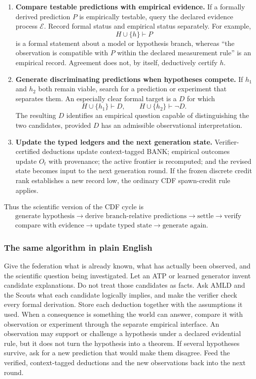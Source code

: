 \documentclass[11pt]{article}
\theoremstyle{definition}
\begin{document}
\begin{enumerate}[label=\textbf{Step \arabic*.},leftmargin=*]
\item \textbf{Compare testable predictions with empirical evidence.}
If a formally derived prediction $P$ is empirically testable, query the declared evidence process $\mathcal E$. Record formal status and empirical status separately. For example,
\[
H\cup\{h\}\vdash P
\]
is a formal statement about a model or hypothesis branch, whereas ``the observation is compatible with $P$ within the declared measurement rule'' is an empirical record. Agreement does not, by itself, deductively certify $h$.

\item \textbf{Generate discriminating predictions when hypotheses compete.}
If $h_1$ and $h_2$ both remain viable, search for a prediction or experiment that separates them. An especially clear formal target is a $D$ for which
\[
H\cup\{h_1\}\vdash D,
\qquad
H\cup\{h_2\}\vdash\neg D.
\]
The resulting $D$ identifies an empirical question capable of distinguishing the two candidates, provided $D$ has an admissible observational interpretation.

\item \textbf{Update the typed ledgers and the next generation state.}
Verifier-certified deductions update context-tagged BANK; empirical outcomes update $O_t$ with provenance; the active frontier is recomputed; and the revised state becomes input to the next generation round. If the frozen discrete credit rank establishes a new record low, the ordinary CDF spawn-credit rule applies.
\end{enumerate}

Thus the scientific version of the CDF cycle is
\[
\boxed{\begin{gathered}
\text{generate hypothesis}\to\text{derive branch-relative predictions}\to\text{settle}\to\text{verify}\\
\text{compare with evidence}\to\text{update typed state}\to\text{generate again}.
\end{gathered}}
\]

\subsubsection*{The same algorithm in plain English}
Give the federation what is already known, what has actually been observed, and the scientific question being investigated. Let an ATP or learned generator invent candidate explanations. Do not treat those candidates as facts. Ask AMLD and the Scouts what each candidate logically implies, and make the verifier check every formal derivation. Store each deduction together with the assumptions it used. When a consequence is something the world can answer, compare it with observation or experiment through the separate empirical interface. An observation may support or challenge a hypothesis under a declared evidential rule, but it does not turn the hypothesis into a theorem. If several hypotheses survive, ask for a new prediction that would make them disagree. Feed the verified, context-tagged deductions and the new observations back into the next round.
\end{document}
